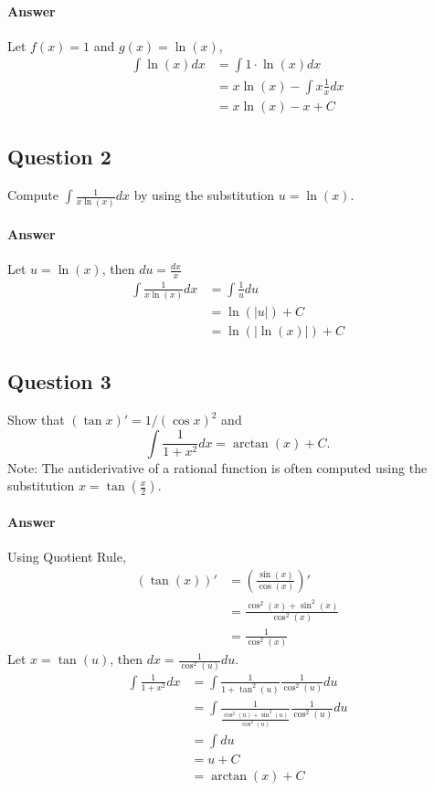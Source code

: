 \paragraph{Answer}
Let $ f(x) = 1 $ and $ g(x) = \ln (x) $,
\begin{align*}
    \int \ln (x) dx &= \int 1 \cdot \ln (x) dx \\
                    &= x \ln (x) - \int x \frac{1}{x} dx \\
                    &= x \ln (x) - x + C
\end{align*}

\subsection{Question 2}
Compute $ \int \frac{1}{x \ln (x)} dx $ by using the substitution
    $ u = \ln (x) $.

\paragraph{Answer}
Let $ u = \ln (x) $, then $ du = \frac{dx}{x} $
\begin{align*}
    \int \frac{1}{x \ln (x)} dx &= \int \frac{1}{u} du \\
                                &= \ln (|u|) + C \\
                                &= \ln (| \ln (x) |) + C
\end{align*}

\subsection{Question 3}
Show that $ (\tan x)' = 1 / (\cos x)^2 $ and
\begin{equation*}
    \int \frac{1}{1 + x^2} dx = \arctan (x) + C.
\end{equation*}
Note: The antiderivative of a rational function is often computed using the
    substitution $ x = \tan (\frac{x}{2}) $.

\paragraph{Answer}
Using Quotient Rule,
\begin{align*}
    (\tan (x))' &= \left( \frac{\sin (x)}{\cos (x)} \right)' \\
                &= \frac{\cos^2 (x) + \sin^2 (x)}{\cos^2 (x)} \\
                &= \frac{1}{\cos^2 (x)}
\end{align*}
Let $ x = \tan (u) $, then $ dx = \frac{1}{\cos^2 (u)} du $.
\begin{align*}
    \int \frac{1}{1 + x^2} dx
        &= \int \frac{1}{1 + \tan^2 (u)} \frac{1}{\cos^2 (u)} du \\
        &= \int \frac{1}{\frac{\cos^2 (u) + \sin^2 (u)}{\cos^2 (u)}}
            \frac{1}{\cos^2 (u)} du \\
        &= \int du \\
        &= u + C \\
        &= \arctan (x) + C
\end{align*}
